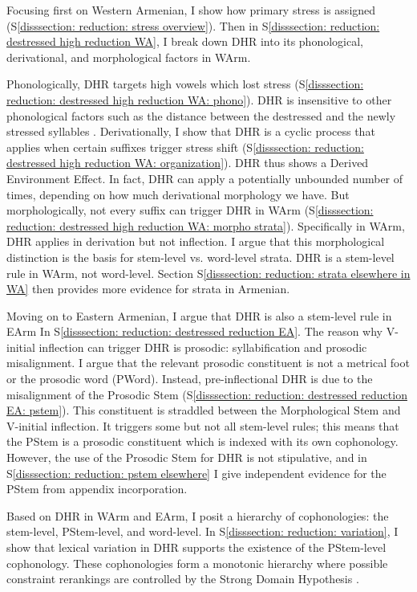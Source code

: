 Focusing first on Western Armenian, I show how primary stress is assigned   (S\ref{disssection: reduction: stress overview}). Then in S\ref{disssection: reduction: destressed high reduction WA}, I break down DHR   into its phonological, derivational, and morphological factors in WArm. 

Phonologically, DHR targets high vowels which lost stress (S\ref{disssection: reduction: destressed high reduction WA: phono}). DHR is insensitive to other phonological factors such as the distance between the destressed and the newly stressed syllables . Derivationally, I show that DHR is a cyclic process that applies when certain suffixes trigger stress shift  (S\ref{disssection: reduction: destressed high reduction WA: organization}).  DHR thus  shows a Derived Environment Effect. In fact, DHR can apply a potentially unbounded number of times, depending on how much derivational morphology we have. But morphologically, not every suffix can trigger DHR in WArm (S\ref{disssection: reduction: destressed high reduction WA: morpho strata}).  Specifically in WArm, DHR applies in derivation but not inflection.
I argue that this morphological distinction is the basis for   stem-level vs. word-level strata.  DHR is a {stem-level} rule in WArm, not word-level.  Section S\ref{disssection: reduction: strata elsewhere in WA} then provides more evidence for strata in Armenian. 

Moving on to   Eastern Armenian, I argue that  DHR is also a stem-level rule in EArm In S\ref{disssection: reduction: destressed reduction EA}.    The reason why V-initial inflection can trigger DHR is {prosodic}: syllabification and prosodic misalignment. I argue that the relevant prosodic constituent is not a metrical foot or the prosodic word (PWord). Instead, pre-inflectional DHR is due to the misalignment of the Prosodic Stem  \citep{Downing-1999-ProsodicStem}  (S\ref{disssection: reduction: destressed reduction EA: pstem}). This constituent is   straddled between the Morphological Stem and  V-initial inflection. It triggers some but not all stem-level rules; this means that the PStem is a prosodic constituent which is indexed with its own cophonology.  
However, the use of the Prosodic Stem for DHR  is not stipulative,  and in S\ref{disssection: reduction: pstem  elsewhere}  I give independent evidence for the PStem from appendix incorporation.

Based on DHR in WArm and EArm, I  posit   a hierarchy of cophonologies: the stem-level, PStem-level, and word-level. In S\ref{disssection: reduction: variation}, I show that lexical variation in DHR supports the existence of the PStem-level cophonology. These cophonologies form a monotonic hierarchy where possible constraint rerankings are controlled by  the Strong Domain Hypothesis \citep{Myers-1991-StructurePreservationStrongDomainHypothesis}. 




